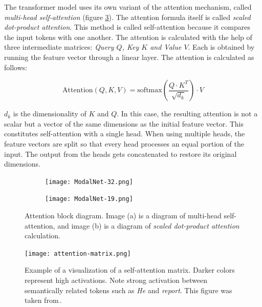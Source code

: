 The transformer model uses its own variant of the attention mechanism, called \emph{multi-head self-attention} (figure \ref{fig:attention}). The attention formula itself is called \emph{scaled dot-product attention}. This method is called self-attention because it compares the input tokens with one another. The attention is calculated with the help of three intermediate matrices: \emph{Query $Q$, Key $K$ \emph{and} Value $V$}. Each is obtained by running the feature vector through a linear layer. The attention is calculated as follows:

\begin{equation}
  \text{Attention}(Q, K, V) = \text{softmax}(\frac{Q \cdot K^{T}}{\sqrt{d_{k}}})\cdot V
\end{equation}


$d_{k}$ is the dimensionality of $K$ and $Q$. In this case, the resulting attention is not a scalar but a vector of the same dimensions as the initial feature vector. This constitutes self-attention with a single head. When using multiple heads, the feature vectors are split so that every head processes an equal portion of the input. The output from the heads gets concatenated to restore its original dimensions.

\begin{figure}[ht]
  \centering
  \begin{subfigure}[t]{0.3\textwidth}
    \texttt{[image: ModalNet-32.png]}
    \label{fig:attention_a}
    \caption{}
  \end{subfigure}
  \hspace{3cm}
  \begin{subfigure}[t]{0.2\textwidth}
    \texttt{[image: ModalNet-19.png]}
    \label{fig:attention_b}
    \caption{}
  \end{subfigure}
  \caption{Attention block diagram. Image (a) is a diagram of multi-head self-attention, and image (b) is a diagram of \emph{scaled dot-product attention} calculation.}
  \label{fig:attention}
\end{figure}

\begin{figure}[ht]
  \centering
  \texttt{[image: attention-matrix.png]}
  \caption{Example of a visualization of a self-attention matrix. Darker colors represent high activations. Note strong activation between semantically related tokens such as \emph{He} and \emph{report}. This figure was taken from\,\cite{attention-matrix}.}
  \label{fig:attention-matrix}
\end{figure}

